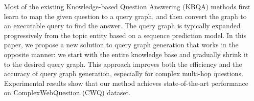 Most of the existing Knowledge-based Question Answering (KBQA) methods first learn to map the given question to a query graph, and then convert the graph to an executable query to find the answer. The query graph is typically expanded progressively from the topic entity based on a sequence prediction model. In this paper, we propose a new solution to query graph generation that works in the opposite manner: we start with the entire knowledge base and gradually shrink it to the desired query graph. This approach improves both the efficiency and the accuracy of query graph generation, especially for complex multi-hop questions. Experimental results show that our method achieves state-of-the-art performance on ComplexWebQuestion (CWQ) dataset.
